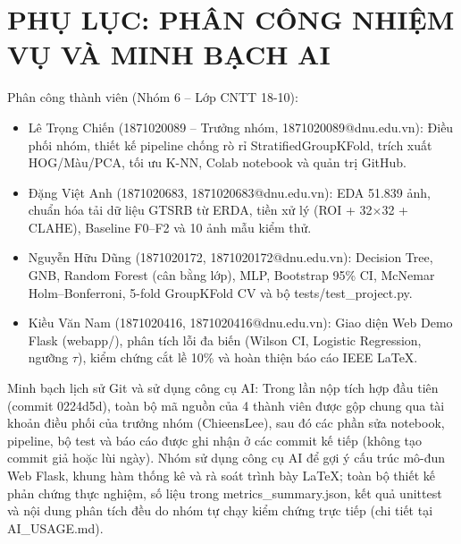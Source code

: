 \documentclass[conference]{IEEEtran}
\begin{document}
\section*{PHỤ LỤC: PHÂN CÔNG NHIỆM VỤ VÀ MINH BẠCH AI}
\noindent Phân công thành viên (Nhóm 6 -- Lớp CNTT 18-10):
\begin{itemize}
  \item Lê Trọng Chiến (1871020089 -- Trưởng nhóm, 1871020089@dnu.edu.vn): Điều phối nhóm, thiết kế pipeline chống rò rỉ StratifiedGroupKFold, trích xuất HOG/Màu/PCA, tối ưu K-NN, Colab notebook và quản trị GitHub.
  \item Đặng Việt Anh (1871020683, 1871020683@dnu.edu.vn): EDA 51.839 ảnh, chuẩn hóa tải dữ liệu GTSRB từ ERDA, tiền xử lý (ROI + 32$\times$32 + CLAHE), Baseline F0--F2 và 10 ảnh mẫu kiểm thử.
  \item Nguyễn Hữu Dũng (1871020172, 1871020172@dnu.edu.vn): Decision Tree, GNB, Random Forest (cân bằng lớp), MLP, Bootstrap 95\% CI, McNemar Holm--Bonferroni, 5-fold GroupKFold CV và bộ tests/test\_project.py.
  \item Kiều Văn Nam (1871020416, 1871020416@dnu.edu.vn): Giao diện Web Demo Flask (webapp/), phân tích lỗi đa biến (Wilson CI, Logistic Regression, ngưỡng $\tau$), kiểm chứng cắt lề 10\% và hoàn thiện báo cáo IEEE LaTeX.
\end{itemize}
\noindent Minh bạch lịch sử Git và sử dụng công cụ AI: Trong lần nộp tích hợp đầu tiên (commit 0224d5d), toàn bộ mã nguồn của 4 thành viên được gộp chung qua tài khoản điều phối của trưởng nhóm (ChieensLee), sau đó các phần sửa notebook, pipeline, bộ test và báo cáo được ghi nhận ở các commit kế tiếp (không tạo commit giả hoặc lùi ngày). Nhóm sử dụng công cụ AI để gợi ý cấu trúc mô-đun Web Flask, khung hàm thống kê và rà soát trình bày LaTeX; toàn bộ thiết kế phản chứng thực nghiệm, số liệu trong metrics\_summary.json, kết quả unittest và nội dung phân tích đều do nhóm tự chạy kiểm chứng trực tiếp (chi tiết tại AI\_USAGE.md).
\end{document}
